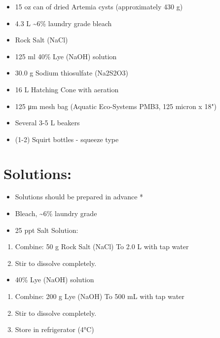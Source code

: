 \documentclass[
]{book}
\providecommand{\tightlist}{%
  \setlength{\itemsep}{0pt}\setlength{\parskip}{0pt}}
\begin{document}
\begin{itemize}
\tightlist
\item
  15 oz can of dried Artemia cysts (approximately 430 g)
\item
  4.3 L \textasciitilde6\% laundry grade bleach
\item
  Rock Salt (NaCl)
\item
  125 ml 40\% Lye (NaOH) solution
\item
  30.0 g Sodium thiosulfate (Na2S2O3)
\item
  16 L Hatching Cone with aeration
\item
  125 μm mesh bag (Aquatic Eco-Systems PMB3, 125 micron x 18")
\item
  Several 3-5 L beakers
\item
  (1-2) Squirt bottles - squeeze type
\end{itemize}

\hypertarget{solutions}{%
\section{Solutions:}\label{solutions}}

\begin{itemize}
\item
  Solutions should be prepared in advance *
\item
  Bleach, \textasciitilde6\% laundry grade
\item
  25 ppt Salt Solution:
\end{itemize}

\begin{enumerate}
\def\labelenumi{\arabic{enumi}.}
\tightlist
\item
  Combine: 50 g Rock Salt (NaCl) To 2.0 L with tap water
\item
  Stir to dissolve completely.
\end{enumerate}

\begin{itemize}
\tightlist
\item
  40\% Lye (NaOH) solution
\end{itemize}

\begin{enumerate}
\def\labelenumi{\arabic{enumi}.}
\tightlist
\item
  Combine: 200 g Lye (NaOH) To 500 mL with tap water
\item
  Stir to dissolve completely.
\item
  Store in refrigerator (4°C)
\end{enumerate}
\end{document}
